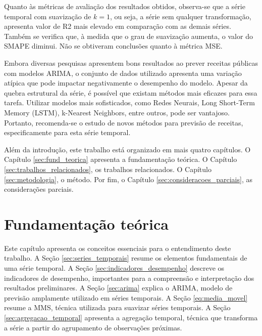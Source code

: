 \documentclass[12pt]{tcc}
\begin{document}
Quanto às métricas de avaliação dos resultados obtidos, observa-se que a série temporal com suavização de $k=1$, ou seja, a série sem qualquer transformação, apresenta valor de \gls{R2} mais elevado em comparação com as demais séries. Também se verifica que, à medida que o grau de suavização aumenta, o valor do \gls{SMAPE} diminui. Não se obtiveram conclusões quanto à métrica \gls{MSE}.

Embora diversas pesquisas apresentem bons resultados ao prever receitas públicas com modelos \gls{ARIMA}, o conjunto de dados utilizado apresenta uma variação atípica que pode impactar negativamente o desempenho do modelo. Apesar da quebra estrutural da série, é possível que existam métodos mais eficazes para essa tarefa. Utilizar modelos mais sofisticados, como Redes Neurais, Long Short-Term Memory (LSTM), k-Nearest Neighbors, entre outros, pode ser vantajoso. Portanto, recomenda-se o estudo de novos métodos para previsão de receitas, especificamente para esta série temporal.

Além da introdução, este trabalho está organizado em mais quatro capítulos. O Capítulo \ref{sec:fund_teorica} apresenta a fundamentação teórica. O Capítulo \ref{sec:trabalhos_relacionados}, os trabalhos relacionados. O Capítulo \ref{sec:metodologia}, o método. Por fim, o Capítulo \ref{sec:consideracoes_parciais}, as considerações parciais.

\chapter{Fundamentação teórica}
\label{sec:background}
\label{sec:fund_teorica}

Este capítulo apresenta os conceitos essenciais para o entendimento deste trabalho. A Seção \ref{sec:series_temporais} resume os elementos fundamentais de uma série temporal. A Seção \ref{sec:indicadores_desempenho} descreve os indicadores de desempenho, importantes para a compreensão e interpretação dos resultados preliminares. A Seção \ref{sec:arima} explica o \gls{ARIMA}, modelo de previsão amplamente utilizado em séries temporais. A Seção \ref{eq:media_movel} resume a \gls{MMS}, técnica utilizada para suavizar séries temporais. A Seção \ref{sec:agregacao_temporal} apresenta a agregação temporal, técnica que transforma a série a partir do agrupamento de observações próximas.
\end{document}

